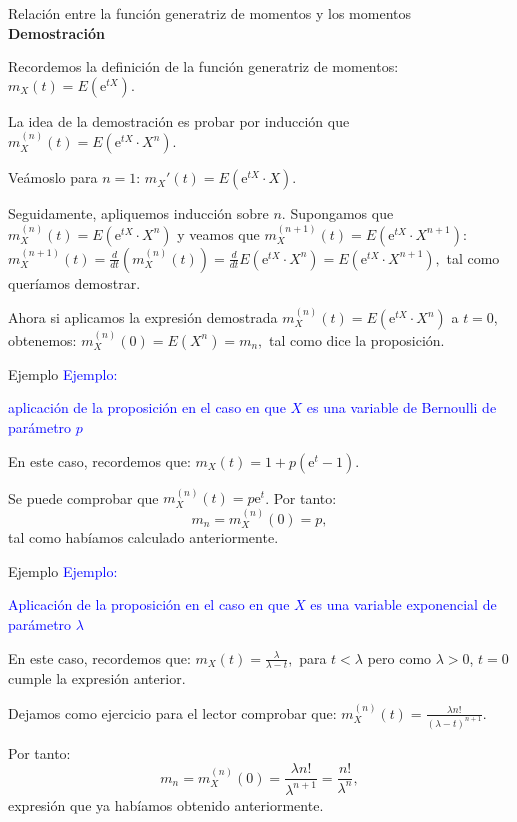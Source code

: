 \documentclass[
  ignorenonframetext,
  aspectratio=169]{beamer}
\newcommand\blue[1]{\textcolor{blue}{#1}}
\begin{document}
\begin{frame}{Relación entre la función generatriz de momentos y los
momentos}
\protect\hypertarget{relaciuxf3n-entre-la-funciuxf3n-generatriz-de-momentos-y-los-momentos-1}{}
\textbf{Demostración}

Recordemos la definición de la función generatriz de momentos:
\(m_X(t)=E\left(\mathrm{e}^{tX}\right).\)

La idea de la demostración es probar por inducción que
\(m_X^{(n)}(t) =E\left(\mathrm{e}^{tX}\cdot X^n\right)\).

Veámoslo para \(n=1\): \(m_X'(t)=E\left(\mathrm{e}^{tX}\cdot X\right)\).

Seguidamente, apliquemos inducción sobre \(n\). Supongamos que
\(m_X^{(n)}(t) =E\left(\mathrm{e}^{tX}\cdot X^n\right)\) y veamos que
\(m_X^{(n+1)}(t) =E\left(\mathrm{e}^{tX}\cdot X^{n+1}\right)\):
\(m_X^{(n+1)}(t) =\frac{d}{dt}(m_X^{(n)}(t)) =\frac{d}{dt}E\left(\mathrm{e}^{tX}\cdot X^n\right) = E\left(\mathrm{e}^{tX}\cdot X^{n+1}\right),\)
tal como queríamos demostrar.

Ahora si aplicamos la expresión demostrada
\(m_X^{(n)}(t) =E\left(\mathrm{e}^{tX}\cdot X^n\right)\) a \(t=0\),
obtenemos: \(m_X^{(n)}(0) =E\left(X^n\right)=m_n,\) tal como dice la
proposición.
\end{frame}

\begin{frame}{Ejemplo}
\protect\hypertarget{ejemplo}{}
\blue{Ejemplo:}

\blue{ aplicación de la proposición en el caso en que $X$ es una variable de Bernoulli de parámetro $p$}

En este caso, recordemos que:
\(m_X (t)=1+p\left(\mathrm{e}^t -1 \right).\)

Se puede comprobar que \(m_X^{(n)}(t)=p\mathrm{e}^t\). Por tanto: \[
m_n = m_X^{(n)}(0)=p,
\] tal como habíamos calculado anteriormente.
\end{frame}

\begin{frame}{Ejemplo}
\protect\hypertarget{ejemplo-1}{}
\blue{Ejemplo:}

\blue{Aplicación de la proposición en el caso en que $X$ es una variable exponencial de parámetro $\lambda$}

En este caso, recordemos que: \(m_X (t)=\frac{\lambda}{\lambda -t},\)
para \(t<\lambda\) pero como \(\lambda >0\), \(t=0\) cumple la expresión
anterior.

Dejamos como ejercicio para el lector comprobar que:
\(m_X^{(n)}(t)=\frac{\lambda n!}{(\lambda-t)^{n+1}}\).

Por tanto: \[
m_n = m_X^{(n)}(0) = \frac{\lambda n!}{\lambda^{n+1}}=\frac{n!}{\lambda^n},
\] expresión que ya habíamos obtenido anteriormente.
\end{frame}
\end{document}
